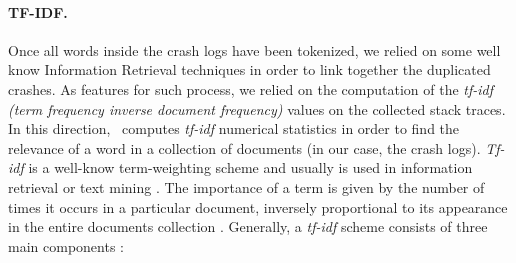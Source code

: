 \paragraph{TF-IDF.} 
Once all words inside the crash logs have been tokenized, we relied on some well know Information Retrieval techniques in order to link together the duplicated crashes.
As features for such process, we relied on the computation of the \textit{tf-idf} \textit{(term frequency inverse document frequency)} values on the collected stack traces. 
In this direction, \toolname\ computes \textit{tf-idf} numerical statistics in order to find the relevance of a word in a collection of documents (in our case, the crash logs). 
\textit{Tf-idf} is a well-know term-weighting scheme and usually is used in information retrieval or text mining \cite{tfidf}. %
The importance of a term is given by the number of times it occurs in a particular document, inversely proportional to its appearance in the entire documents collection \cite{campbell}. 
Generally, a \textit{tf-idf} scheme consists of three main components \cite{tfidfsimilarity}: 
